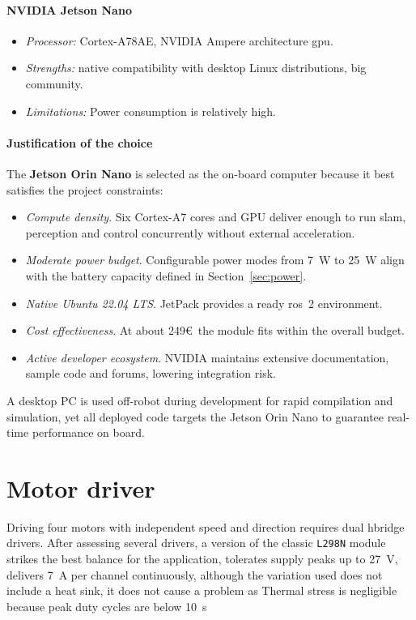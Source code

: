 \paragraph*{NVIDIA Jetson Nano}
\begin{itemize}
  \item \emph{Processor:} Cortex-A78AE, NVIDIA Ampere architecture \gls{gpu}.
  \item \emph{Strengths:} native compatibility with desktop Linux distributions, big community.
  \item \emph{Limitations:} Power consumption is relatively high.
\end{itemize}

\paragraph*{Justification of the choice}  
The \textbf{Jetson Orin Nano} is selected as the on-board computer because it best satisfies the project constraints:

\begin{itemize}
  \item \textit{Compute density}. Six Cortex-A7 cores and GPU deliver enough to run \gls{slam}, perception and control concurrently without external acceleration.
  \item \textit{Moderate power budget}. Configurable power modes from \SI{7}{\watt} to \SI{25}{\watt} align with the battery capacity defined in Section~\ref{sec:power}.
  \item \textit{Native Ubuntu 22.04 LTS}. JetPack provides a ready \gls{ros}~2 environment.
  \item \textit{Cost effectiveness}. At about 249\euro~the module fits within the overall budget.
  \item \textit{Active developer ecosystem}. NVIDIA maintains extensive documentation, sample code and forums, lowering integration risk.
\end{itemize}

A desktop PC is used off-robot during development for rapid compilation and simulation, yet all deployed code targets the Jetson Orin Nano to guarantee real-time performance on board.

\section{Motor driver}

Driving four motors with independent speed and direction requires dual \gls{hbridge} drivers. After assessing several drivers, a version of the classic \texttt{L298N} module strikes the best balance for the application, tolerates supply peaks up to \SI{27}{\volt}, delivers \SI{7}{\ampere} per channel continuously, although the variation used does not include a heat sink, it does not cause a problem as Thermal stress is negligible because peak duty cycles are below \SI{10}{\second}

